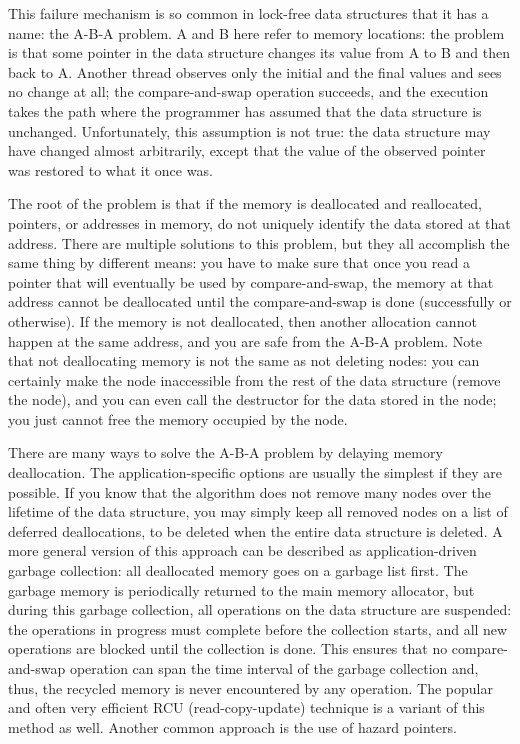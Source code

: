 This failure mechanism is so common in lock-free data structures that it has a name: the A-B-A problem. A and B here refer to memory locations: the problem is that some pointer in the data structure changes its value from A to B and then back to A. Another thread observes only the initial and the final values and sees no change at all; the compare-and-swap operation succeeds, and the execution takes the path where the programmer has assumed that the data structure is unchanged. Unfortunately, this assumption is not true: the data structure may have changed almost arbitrarily, except that the value of the observed pointer was restored to what it once was. 

The root of the problem is that if the memory is deallocated and reallocated, pointers, or addresses in memory, do not uniquely identify the data stored at that address. There are multiple solutions to this problem, but they all accomplish the same thing by different means: you have to make sure that once you read a pointer that will eventually be used by compare-and-swap, the memory at that address cannot be deallocated until the compare-and-swap is done (successfully or otherwise). If the memory is not deallocated, then another allocation cannot happen at the same address, and you are safe from the A-B-A problem. Note that not deallocating memory is not the same as not deleting nodes: you can certainly make the node inaccessible from the rest of the data structure (remove the node), and you can even call the destructor for the data stored in the node; you just  cannot free the memory occupied by the node. 

There are many ways to solve the A-B-A problem by delaying memory deallocation. The application-specific options are usually the simplest if they are possible. If you know that the algorithm does not remove many nodes over the lifetime of the data structure, you may simply keep all removed nodes on a list of deferred deallocations, to be deleted when the entire data structure is deleted. A more general version of this approach can be described as application-driven garbage collection: all deallocated memory goes on a garbage list first. The garbage memory is periodically returned to the main memory allocator, but during this garbage collection, all operations on the data structure are suspended: the operations in progress must complete before the collection starts, and all new operations are blocked until the collection is done. This ensures that no compare-and-swap operation can span the time interval of the garbage collection and, thus, the recycled memory is never encountered by any operation. The popular and often very efficient RCU (read-copy-update) technique is a variant of this method as well. Another common approach is the use of hazard pointers.

